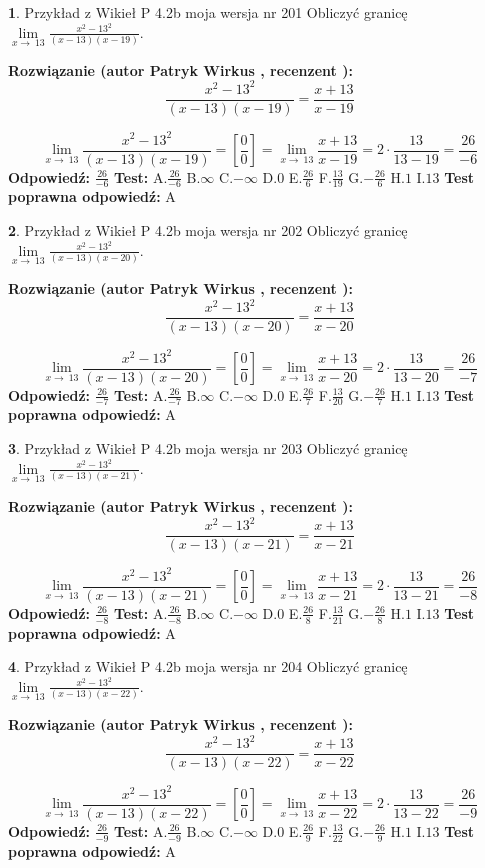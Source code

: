 \documentclass[12pt, a4paper]{article}
\theoremstyle{definition} %
\newtheorem{zad}{}
\newcommand{\zadStart}[1]{\begin{zad}#1\newline}
\newcommand{\zadStop}{\end{zad}}
\newcommand{\rozwStart}[2]{\noindent \textbf{Rozwiązanie (autor #1 , recenzent #2): }\newline}
\newcommand{\rozwStop}{\newline}
\newcommand{\odpStart}{\noindent \textbf{Odpowiedź:}\newline}
\newcommand{\odpStop}{\newline}
\newcommand{\testStart}{\noindent \textbf{Test:}\newline}
\newcommand{\testStop}{\newline}
\newcommand{\kluczStart}{\noindent \textbf{Test poprawna odpowiedź:}\newline}
\newcommand{\kluczStop}{\newline}
\begin{document}
\zadStart{Przykład z Wikieł P 4.2b moja wersja nr 201}
Obliczyć granicę $\lim\limits_{x\to\ 13}\frac{x^{2}-13^{2}}{(x-13)(x-19)}$.
\zadStop
\rozwStart{Patryk Wirkus}{}
$$\frac{x^{2}-13^{2}}{(x-13)(x-19)}=\frac{x+13}{x-19}$$

$$\lim\limits_{x\to\ 13}\frac{x^{2}-13^{2}}{(x-13)(x-19)}=[\frac{0}{0}]=\lim\limits_{x\to\ 13}\frac{x+13}{x-19}=2 \cdot \frac{13}{13-19} = \frac{26}{-6}$$
\rozwStop
\odpStart
$\frac{26}{-6}$
\odpStop
\testStart
A.$\frac{26}{-6}$
B.$\infty$
C.$-\infty$
D.$0$
E.$\frac{26}{6}$
F.$\frac{13}{19}$
G.$-\frac{26}{6}$
H.$1$
I.$13$
\testStop
\kluczStart
A
\kluczStop



\zadStart{Przykład z Wikieł P 4.2b moja wersja nr 202}
Obliczyć granicę $\lim\limits_{x\to\ 13}\frac{x^{2}-13^{2}}{(x-13)(x-20)}$.
\zadStop
\rozwStart{Patryk Wirkus}{}
$$\frac{x^{2}-13^{2}}{(x-13)(x-20)}=\frac{x+13}{x-20}$$

$$\lim\limits_{x\to\ 13}\frac{x^{2}-13^{2}}{(x-13)(x-20)}=[\frac{0}{0}]=\lim\limits_{x\to\ 13}\frac{x+13}{x-20}=2 \cdot \frac{13}{13-20} = \frac{26}{-7}$$
\rozwStop
\odpStart
$\frac{26}{-7}$
\odpStop
\testStart
A.$\frac{26}{-7}$
B.$\infty$
C.$-\infty$
D.$0$
E.$\frac{26}{7}$
F.$\frac{13}{20}$
G.$-\frac{26}{7}$
H.$1$
I.$13$
\testStop
\kluczStart
A
\kluczStop



\zadStart{Przykład z Wikieł P 4.2b moja wersja nr 203}
Obliczyć granicę $\lim\limits_{x\to\ 13}\frac{x^{2}-13^{2}}{(x-13)(x-21)}$.
\zadStop
\rozwStart{Patryk Wirkus}{}
$$\frac{x^{2}-13^{2}}{(x-13)(x-21)}=\frac{x+13}{x-21}$$

$$\lim\limits_{x\to\ 13}\frac{x^{2}-13^{2}}{(x-13)(x-21)}=[\frac{0}{0}]=\lim\limits_{x\to\ 13}\frac{x+13}{x-21}=2 \cdot \frac{13}{13-21} = \frac{26}{-8}$$
\rozwStop
\odpStart
$\frac{26}{-8}$
\odpStop
\testStart
A.$\frac{26}{-8}$
B.$\infty$
C.$-\infty$
D.$0$
E.$\frac{26}{8}$
F.$\frac{13}{21}$
G.$-\frac{26}{8}$
H.$1$
I.$13$
\testStop
\kluczStart
A
\kluczStop



\zadStart{Przykład z Wikieł P 4.2b moja wersja nr 204}
Obliczyć granicę $\lim\limits_{x\to\ 13}\frac{x^{2}-13^{2}}{(x-13)(x-22)}$.
\zadStop
\rozwStart{Patryk Wirkus}{}
$$\frac{x^{2}-13^{2}}{(x-13)(x-22)}=\frac{x+13}{x-22}$$

$$\lim\limits_{x\to\ 13}\frac{x^{2}-13^{2}}{(x-13)(x-22)}=[\frac{0}{0}]=\lim\limits_{x\to\ 13}\frac{x+13}{x-22}=2 \cdot \frac{13}{13-22} = \frac{26}{-9}$$
\rozwStop
\odpStart
$\frac{26}{-9}$
\odpStop
\testStart
A.$\frac{26}{-9}$
B.$\infty$
C.$-\infty$
D.$0$
E.$\frac{26}{9}$
F.$\frac{13}{22}$
G.$-\frac{26}{9}$
H.$1$
I.$13$
\testStop
\kluczStart
A
\kluczStop
\end{document}

